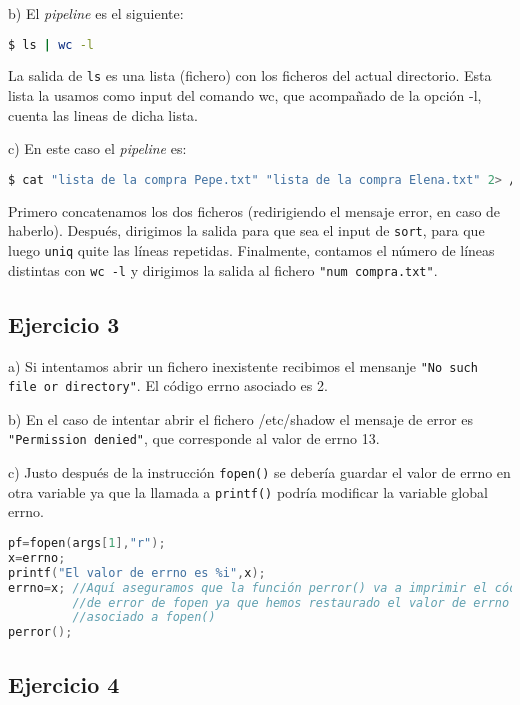 \documentclass{article}
\begin{document}
b) El \textit{pipeline} es el siguiente:

\begin{lstlisting}[language=bash]
$ ls | wc -l
\end{lstlisting}

La salida de \texttt{ls} es una lista (fichero) con los ficheros del actual directorio.
Esta lista la usamos como input del comando wc, que acompañado de la opción -l, cuenta las lineas de dicha lista.


c) En este caso el \textit{pipeline} es: 

\begin{lstlisting}[language=bash]
$ cat "lista de la compra Pepe.txt" "lista de la compra Elena.txt" 2> /dev/null | sort | uniq | wc -l > "num compra.txt"
\end{lstlisting}

Primero concatenamos los dos ficheros (redirigiendo el mensaje error, en caso de haberlo). Después, dirigimos la salida para que sea el input de \texttt{sort}, para que luego \texttt{uniq} quite las líneas repetidas. Finalmente, contamos el número de líneas distintas con \texttt{wc -l} y dirigimos la salida al fichero \texttt{"num compra.txt"}.

\subsection*{Ejercicio 3}

a) Si intentamos abrir un fichero inexistente recibimos el mensanje \texttt{"No such file or directory"}. El código errno asociado es 2.

b) En el caso de intentar abrir el fichero /etc/shadow el  mensaje de error es \texttt{"Permission denied"}, que corresponde al valor de errno 13.

c) Justo después de la instrucción \texttt{fopen()} se debería guardar el valor de errno en otra variable ya que la llamada a \texttt{printf()} podría modificar la variable global errno.

\begin{lstlisting}[language=C, texcl=true]
pf=fopen(args[1],"r"); 
x=errno;
printf("El valor de errno es %i",x);
errno=x; //Aquí aseguramos que la función perror() va a imprimir el código 
         //de error de fopen ya que hemos restaurado el valor de errno 
         //asociado a fopen()
perror();
\end{lstlisting}


\subsection*{Ejercicio 4}
\end{document}
